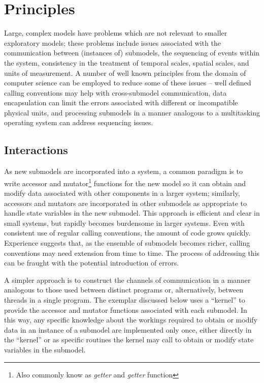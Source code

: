 \section{Principles}
Large, complex models have problems which are not relevant to smaller
exploratory models; these problems include issues associated with the
communication between (instances of) submodels, the sequencing of
events within the system, consistency in the treatment of temporal scales,
spatial scales, and units of measurement. A number of well known
principles from the domain of computer science can be employed to
reduce some of these issues -- well defined calling conventions may
help with cross-submodel communication, data encapsulation can limit
the errors associated with different or incompatible physical units,
and processing submodels in a manner analogous to a multitasking
operating system can address sequencing issues.

\subsection{Interactions}
As new submodels are incorporated into a system, a common paradigm is
to write accessor and mutator\footnote{Also commonly know
as \textit{getter} and \textit{getter} function} functions for the new
model so it can obtain and modify data associated with other
components in a larger system; similarly, accessors and mutators are
incorporated in other submodels as appropriate to handle state
variables in the new submodel.  This approach is efficient and clear
in small systems, but rapidly becomes burdensome in larger systems.
Even with consistent use of regular calling conventions, the amount of
code grows quickly. Experience suggests that, as the ensemble of
submodels becomes richer, calling conventions may need extension from
time to time. The process of addressing this can be fraught with the
potential introduction of errors.

A simpler approach is to construct the channels of communication in a
manner analogous to those used between distinct programs or,
alternatively, between threads in a single program.  The exemplar
discussed below uses a ``kernel'' to provide the accessor and mutator
functions associated with each submodel.  In this way, any specific
knowledge about the workings required to obtain or modify data in an
instance of a submodel are implemented only once, either directly in
the ``kernel'' or as specific routines the kernel may call to obtain
or modify state variables in the submodel.

